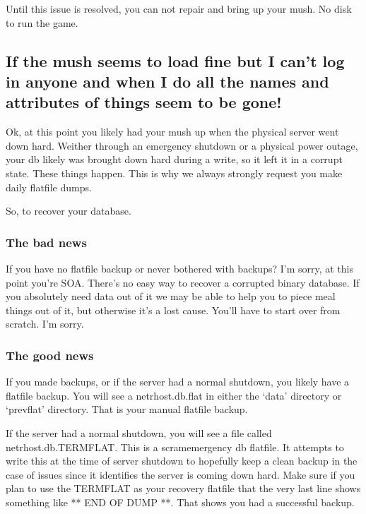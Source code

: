 \documentclass[letterpaper,10pt,english]{sphinxmanual}
\begin{document}
\sphinxAtStartPar
Until this issue is resolved, you can not repair and bring up your mush.
No disk to run the game.


\subsection{If the mush seems to load fine but I can’t log in anyone and when I do all the names and attributes of things seem to be gone!}
\label{\detokenize{troubleshooting:if-the-mush-seems-to-load-fine-but-i-can-t-log-in-anyone-and-when-i-do-all-the-names-and-attributes-of-things-seem-to-be-gone}}
\sphinxAtStartPar
Ok, at this point you likely had your mush up when the physical server
went down hard.  Weither through an emergency shutdown or a physical
power outage, your db likely was brought down hard during a write,
so it left it in a corrupt state.  These things happen.  This is
why we always strongly request you make daily flatfile dumps.

\sphinxAtStartPar
So, to recover your database.


\subsubsection{The bad news}
\label{\detokenize{troubleshooting:the-bad-news}}
\sphinxAtStartPar
If you have no flatfile backup or never bothered with backups?
I’m sorry, at this point you’re SOA.  There’s no easy way to
recover a corrupted binary database.  If you absolutely need
data out of it we may be able to help you to piece meal things
out of it, but otherwise it’s a lost cause.  You’ll have to start
over from scratch.  I’m sorry.


\subsubsection{The good news}
\label{\detokenize{troubleshooting:the-good-news}}
\sphinxAtStartPar
If you made backups, or if the server had a normal shutdown, you
likely have a flatfile backup.  You will see a netrhost.db.flat
in either the ‘data’ directory or ‘prevflat’ directory.  That
is your manual flatfile backup.

\sphinxAtStartPar
If the server had a normal shutdown, you will see a file called
netrhost.db.TERMFLAT.  This is a scram\sphinxhyphen{}emergency db flatfile.
It attempts to write this at the time of server shutdown to
hopefully keep a clean backup in the case of issues since
it identifies the server is coming down hard.  Make sure
if you plan to use the TERMFLAT as your recovery flatfile
that the very last line shows something like ** END OF DUMP **.
That shows you had a successful backup.
\end{document}
